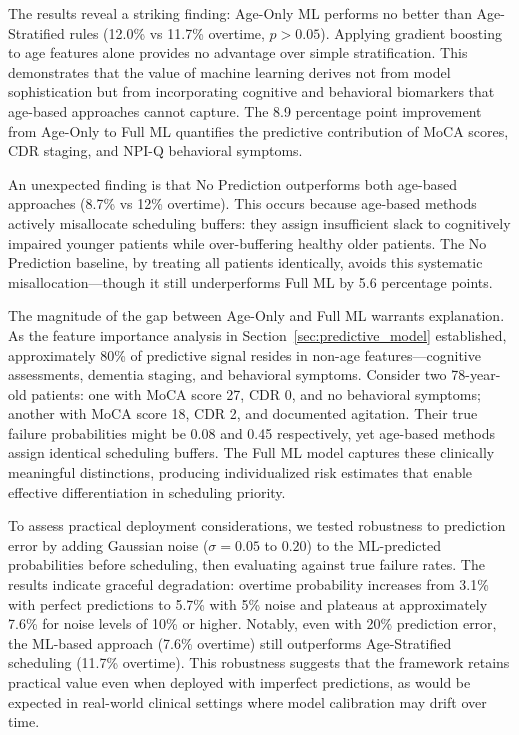 \documentclass[msom,blindrev]{informs3}
\begin{document}
The results reveal a striking finding: Age-Only ML performs no better than Age-Stratified rules (12.0\% vs 11.7\% overtime, $p > 0.05$). Applying gradient boosting to age features alone provides no advantage over simple stratification. This demonstrates that the value of machine learning derives not from model sophistication but from incorporating cognitive and behavioral biomarkers that age-based approaches cannot capture. The 8.9 percentage point improvement from Age-Only to Full ML quantifies the predictive contribution of MoCA scores, CDR staging, and NPI-Q behavioral symptoms.

An unexpected finding is that No Prediction outperforms both age-based approaches (8.7\% vs 12\% overtime). This occurs because age-based methods actively misallocate scheduling buffers: they assign insufficient slack to cognitively impaired younger patients while over-buffering healthy older patients. The No Prediction baseline, by treating all patients identically, avoids this systematic misallocation---though it still underperforms Full ML by 5.6 percentage points.

The magnitude of the gap between Age-Only and Full ML warrants explanation. As the feature importance analysis in Section~\ref{sec:predictive_model} established, approximately 80\% of predictive signal resides in non-age features---cognitive assessments, dementia staging, and behavioral symptoms. Consider two 78-year-old patients: one with MoCA score 27, CDR 0, and no behavioral symptoms; another with MoCA score 18, CDR 2, and documented agitation. Their true failure probabilities might be 0.08 and 0.45 respectively, yet age-based methods assign identical scheduling buffers. The Full ML model captures these clinically meaningful distinctions, producing individualized risk estimates that enable effective differentiation in scheduling priority.

To assess practical deployment considerations, we tested robustness to prediction error by adding Gaussian noise ($\sigma = 0.05$ to $0.20$) to the ML-predicted probabilities before scheduling, then evaluating against true failure rates. The results indicate graceful degradation: overtime probability increases from 3.1\% with perfect predictions to 5.7\% with 5\% noise and plateaus at approximately 7.6\% for noise levels of 10\% or higher. Notably, even with 20\% prediction error, the ML-based approach (7.6\% overtime) still outperforms Age-Stratified scheduling (11.7\% overtime). This robustness suggests that the framework retains practical value even when deployed with imperfect predictions, as would be expected in real-world clinical settings where model calibration may drift over time.
\end{document}
